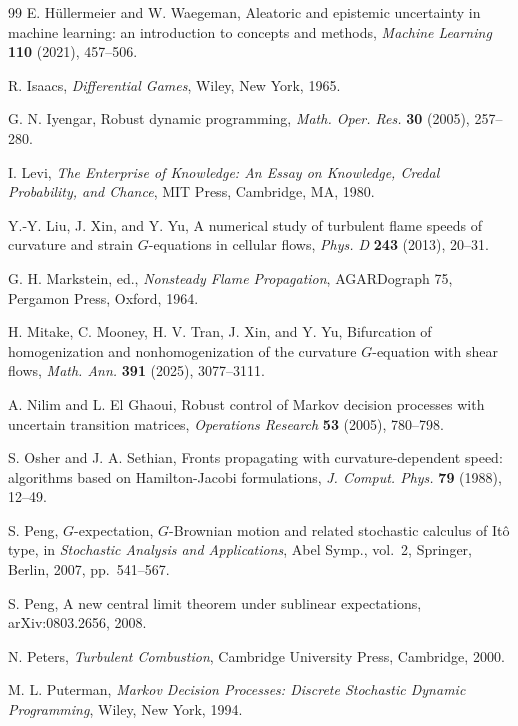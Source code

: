 \documentclass[11pt,reqno,noamsfonts]{amsart}
\theoremstyle{definition}
\theoremstyle{remark}
\begin{document}
\begin{thebibliography}{99}
E. H\"ullermeier and W. Waegeman,
Aleatoric and epistemic uncertainty in machine learning: an introduction to concepts and methods,
\emph{Machine Learning} \textbf{110} (2021), 457--506.

R. Isaacs,
\emph{Differential Games}, Wiley, New York, 1965.

G. N. Iyengar,
Robust dynamic programming,
\emph{Math. Oper. Res.} \textbf{30} (2005), 257--280.

I. Levi,
\emph{The Enterprise of Knowledge: An Essay on Knowledge, Credal Probability, and Chance},
MIT Press, Cambridge, MA, 1980.

Y.-Y. Liu, J. Xin, and Y. Yu,
A numerical study of turbulent flame speeds of curvature and strain $G$-equations in cellular flows,
\emph{Phys. D} \textbf{243} (2013), 20--31.

G. H. Markstein, ed.,
\emph{Nonsteady Flame Propagation}, AGARDograph 75,
Pergamon Press, Oxford, 1964.

H. Mitake, C. Mooney, H. V. Tran, J. Xin, and Y. Yu,
Bifurcation of homogenization and nonhomogenization of the curvature $G$-equation with shear flows,
\emph{Math. Ann.} \textbf{391} (2025), 3077--3111.

A. Nilim and L. El Ghaoui,
Robust control of Markov decision processes with uncertain transition matrices,
\emph{Operations Research} \textbf{53} (2005), 780--798.

S. Osher and J. A. Sethian,
Fronts propagating with curvature-dependent speed: algorithms based on Hamilton-Jacobi formulations,
\emph{J. Comput. Phys.} \textbf{79} (1988), 12--49.

S. Peng,
$G$-expectation, $G$-Brownian motion and related stochastic calculus of
It\^o type,
in \emph{Stochastic Analysis and Applications},
Abel Symp., vol.~2,
Springer, Berlin, 2007, pp.~541--567.

S. Peng,
A new central limit theorem under sublinear expectations,
arXiv:0803.2656, 2008.

N. Peters,
\emph{Turbulent Combustion}, Cambridge University Press, Cambridge, 2000.

M. L. Puterman,
\emph{Markov Decision Processes: Discrete Stochastic Dynamic Programming},
Wiley, New York, 1994.


\end{thebibliography}
\end{document}
